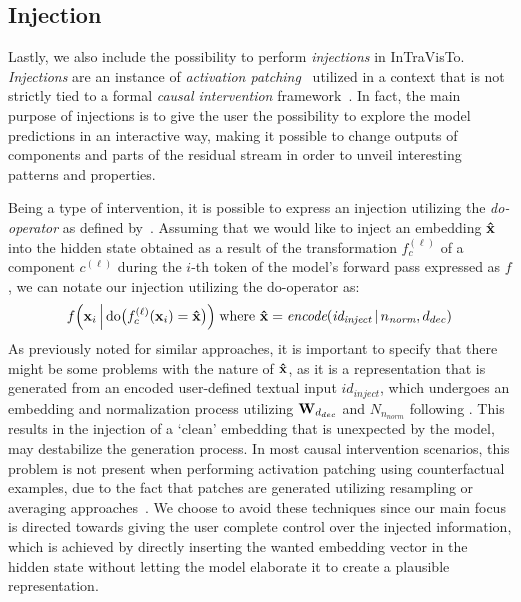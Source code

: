 \subsection{Injection}\label{ssec:method_intravisto_injection}

Lastly, we also include the possibility to perform \emph{injections} in InTraVisTo.
\emph{Injections} are an instance of \emph{activation patching}~\cite{olsson2022,meng2022,hanna2023,conmy2023,wang2023,mohebbi2023,zhang2024} utilized in a context that is not strictly tied to a formal \emph{causal intervention} framework~\cite{geiger2021,mcgrath2023}.
In fact, the main purpose of injections is to give the user the possibility to explore the model predictions in an interactive way, making it possible to change outputs of components and parts of the residual stream in order to unveil interesting patterns and properties.

Being a type of intervention, it is possible to express an injection utilizing the \emph{do-operator} as defined by~\citet{pearl2009}.
Assuming that we would like to inject an embedding $\bm{\mathbf{\hat x}}$ into the hidden state obtained as a result of the transformation $f_c^{(\ell)}$ of a component $c^{(\ell)}$ during the $i$-th token of the model's forward pass expressed as $f$, we can notate our injection utilizing the do-operator as:
\begin{equation}
    \label{eq:method_intravisto_injection}
    f\Bigl(\bm{\mathbf{x}}_i \, \Big| \, \text{do}\bigl(f_c^{(\ell)}(\bm{\mathbf{x}}_i) = \bm{\mathbf{\hat x}}\bigr)\Bigr)
    \; \text{where}\ \bm{\mathbf{\hat x}} = \textit{encode}(\textit{id}_{\textit{inject}} \,|\, n_\textit{norm}, d_{dec})
\end{equation}
As previously noted for similar approaches, it is important to specify that there might be some problems with the nature of $\bm{\mathbf{\hat x}}$, as it is a representation that is generated from an encoded user-defined textual input ${id}_{\textit{inject}}$, which undergoes an embedding and normalization process utilizing $\bm{\mathbf{W}}_{d_{dec}}$ and $N_{n_\textit{norm}}$ following .
This results in the injection of a `clean' embedding that is unexpected by the model,  may destabilize the generation process.
In most causal intervention scenarios, this problem is not present when performing activation patching using counterfactual examples, due to the fact that patches are generated utilizing resampling or averaging approaches~\cite{hanna2023,conmy2023,wang2023}.
We choose to avoid these techniques since our main focus is directed towards giving the user complete control over the injected information, which is achieved by directly inserting the wanted embedding vector in the hidden state without letting the model elaborate it to create a plausible representation.

